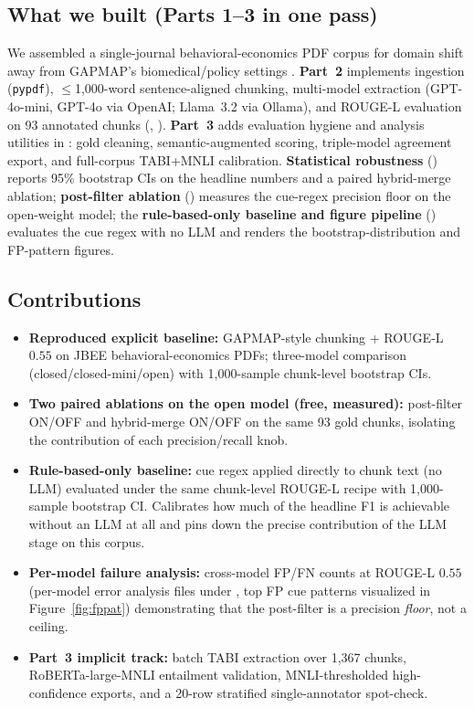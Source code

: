 \documentclass{article}
\begin{document}
\subsection{What we built (Parts 1--3 in one pass)}
We assembled a single-journal behavioral-economics PDF corpus for domain shift away from GAPMAP's biomedical/policy settings \citep{beee2026}. \textbf{Part~2} implements ingestion (\texttt{pypdf}), $\le$1{,}000-word sentence-aligned chunking, multi-model extraction (GPT-4o-mini, GPT-4o via OpenAI; Llama~3.2 via Ollama), and ROUGE-L evaluation on 93 annotated chunks (, ). \textbf{Part~3} adds evaluation hygiene and analysis utilities in : gold cleaning, semantic-augmented scoring, triple-model agreement export, and full-corpus TABI+MNLI calibration. \textbf{Statistical robustness} () reports 95\% bootstrap CIs on the headline numbers and a paired hybrid-merge ablation; \textbf{post-filter ablation} () measures the cue-regex precision floor on the open-weight model; the \textbf{rule-based-only baseline and figure pipeline} () evaluates the cue regex with no LLM and renders the bootstrap-distribution and FP-pattern figures.

\subsection{Contributions}
\begin{itemize}
  \item \textbf{Reproduced explicit baseline:} GAPMAP-style chunking + ROUGE-L $0.55$ on JBEE behavioral-economics PDFs; three-model comparison (closed/closed-mini/open) with 1{,}000-sample chunk-level bootstrap CIs.
  \item \textbf{Two paired ablations on the open model (free, measured):} post-filter ON/OFF and hybrid-merge ON/OFF on the same 93 gold chunks, isolating the contribution of each precision/recall knob.
  \item \textbf{Rule-based-only baseline:} cue regex applied directly to chunk text (no LLM) evaluated under the same chunk-level ROUGE-L recipe with 1{,}000-sample bootstrap CI. Calibrates how much of the headline F1 is achievable without an LLM at all and pins down the precise contribution of the LLM stage on this corpus.
  \item \textbf{Per-model failure analysis:} cross-model FP/FN counts at ROUGE-L $0.55$ (per-model error analysis files under , top FP cue patterns visualized in Figure~\ref{fig:fppat}) demonstrating that the post-filter is a precision \emph{floor}, not a ceiling.
  \item \textbf{Part~3 implicit track:} batch TABI extraction over 1{,}367 chunks, RoBERTa-large-MNLI entailment validation, MNLI-thresholded high-confidence exports, and a 20-row stratified single-annotator spot-check.
\end{itemize}
\end{document}

